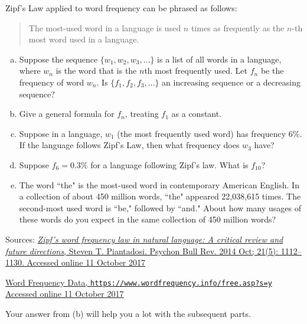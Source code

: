 \begin{question}
	Zipf's Law applied to word frequency can be phrased as follows:
	\begin{quote}
		The most-used word in a language is used $n$ times as frequently as the $n$-th most word used in a language.
	\end{quote}

	\begin{enumerate}[(a)]
		\item Suppose the sequence $\{w_1,w_2,w_3,\ldots\}$ is a list of all words in a language, where $w_n$ is the word that is the $n$th most frequently used. Let $f_n$ be the frequency of word $w_n$. Is $\{f_1,f_2,f_3,\ldots\}$ an increasing sequence or a decreasing sequence?
		\item Give a general formula for $f_n$, treating $f_1$ as a constant.
		\item Suppose in a language, $w_1$ (the most frequently used word) has frequency 6\%. If the language follows Zipf's Law, then what frequency does $w_3$ have?
		\item Suppose $f_6=0.3\%$ for a language following Zipf's law. What is $f_{10}$?
		\item The word ``the" is the most-used word in contemporary American English. In a collection of about 450 million words, ``the" appeared 22,038,615 times. The second-most used word is ``be," followed by ``and." About how many usages of these words do you expect in the same collection of 450 million words?
	\end{enumerate}
	Sources:	\href{https://www.ncbi.nlm.nih.gov/pmc/articles/PMC4176592/}{\textit{Zipf’s word frequency law in natural language: A critical review and future directions},
		Steven T. Piantadosi. Psychon Bull Rev. 2014 Oct; 21(5): 1112–1130. Accessed online 11 October 2017}

	\href{https://www.wordfrequency.info/free.asp?s=y}{Word Frequency Data, \texttt{https://www.wordfrequency.info/free.asp?s=y} Accessed online 11 October 2017}
\end{question}
\begin{hint}
	Your answer from (b) will help you a lot with the subsequent parts.%
\end{hint}
